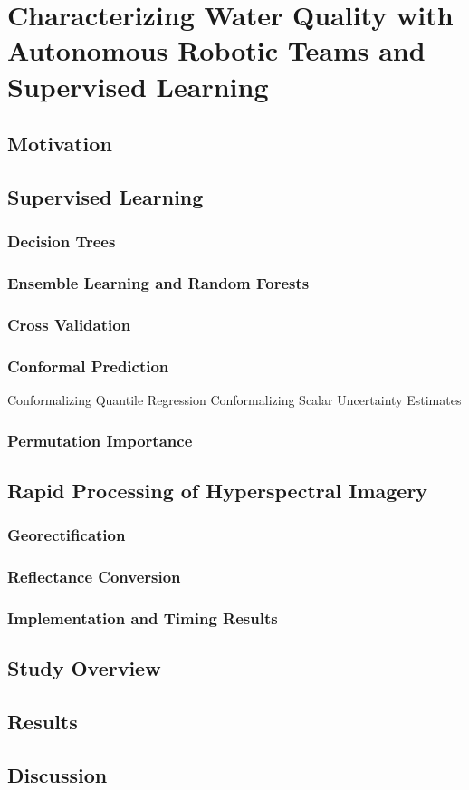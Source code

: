 \chapter{Characterizing Water Quality with Autonomous Robotic Teams and Supervised Learning}\label{ch:robot-team-supervised}


\section{Motivation}

\section{Supervised Learning}
\subsection{Decision Trees}
\subsection{Ensemble Learning and Random Forests}
\subsection{Cross Validation}
\subsection{Conformal Prediction}
Conformalizing Quantile Regression
Conformalizing Scalar Uncertainty Estimates
\subsection{Permutation Importance}

\section{Rapid Processing of Hyperspectral Imagery}
\subsection{Georectification}
\subsection{Reflectance Conversion}
\subsection{Implementation and Timing Results}

\section{Study Overview}

\section{Results}

\section{Discussion}

